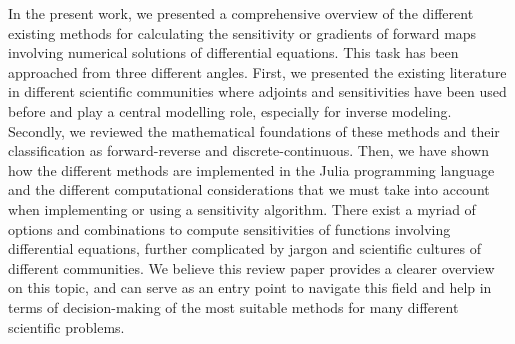 In the present work, we presented a comprehensive overview of the different existing methods for calculating the sensitivity or gradients of forward maps involving numerical solutions of differential equations.
This task has been approached from three different angles.
First, we presented the existing literature in different scientific communities where adjoints and sensitivities have been used before and play a central modelling role, especially for inverse modeling.
Secondly, we reviewed the mathematical foundations of these methods and their classification as forward-reverse and discrete-continuous.
Then, we have shown how the different methods are implemented in the Julia programming language and the different computational considerations that we must take into account when implementing or using a sensitivity algorithm.
There exist a myriad of options and combinations to compute sensitivities of functions involving differential equations, further complicated by jargon and scientific cultures of different communities. We believe this review paper provides a clearer overview on this topic, and can serve as an entry point to navigate this field and help in terms of decision-making of the most suitable methods for many different scientific problems. 


